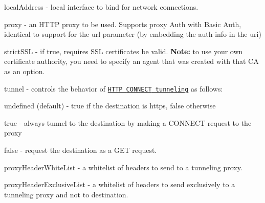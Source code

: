 \begin{DoxyItemize}
\item {\ttfamily local\+Address} -\/ local interface to bind for network connections.
\item {\ttfamily proxy} -\/ an H\+T\+TP proxy to be used. Supports proxy Auth with Basic Auth, identical to support for the {\ttfamily url} parameter (by embedding the auth info in the {\ttfamily uri})
\item {\ttfamily strict\+S\+SL} -\/ if {\ttfamily true}, requires S\+SL certificates be valid. {\bfseries Note\+:} to use your own certificate authority, you need to specify an agent that was created with that CA as an option.
\item {\ttfamily tunnel} -\/ controls the behavior of \href{https://en.wikipedia.org/wiki/HTTP_tunnel#HTTP_CONNECT_tunneling}{\tt H\+T\+TP {\ttfamily C\+O\+N\+N\+E\+CT} tunneling} as follows\+:
\begin{DoxyItemize}
\item {\ttfamily undefined} (default) -\/ {\ttfamily true} if the destination is {\ttfamily https}, {\ttfamily false} otherwise
\item {\ttfamily true} -\/ always tunnel to the destination by making a {\ttfamily C\+O\+N\+N\+E\+CT} request to the proxy
\item {\ttfamily false} -\/ request the destination as a {\ttfamily G\+ET} request.
\end{DoxyItemize}
\item {\ttfamily proxy\+Header\+White\+List} -\/ a whitelist of headers to send to a tunneling proxy.
\item {\ttfamily proxy\+Header\+Exclusive\+List} -\/ a whitelist of headers to send exclusively to a tunneling proxy and not to destination. 



\end{DoxyItemize}
